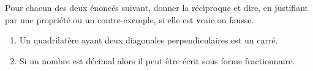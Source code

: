 
\begin{exercice}[\ldots /4]\label{exosmath-0828}

    Pour chacun des deux énoncés suivant, donner la réciproque et dire, en justifiant par une propriété ou un contre-exemple, si elle est vraie ou fausse.
\begin{enumerate}
    \item
       Un quadrilatère ayant deux diagonales perpendiculaires est un carré.
   \item
       Si un nombre est décimal alors il peut être écrit sous forme fractionnaire.
\end{enumerate}

\end{exercice}
